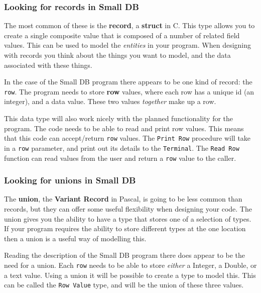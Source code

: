 \subsubsection{Looking for records in Small DB} %
\label{ssub:looking_for_records_in_small_db}

The most common of these is the \textbf{record}, a \textbf{struct} in C. This type allows you to create a single composite value that is composed of a number of related field values. This can be used to model the \emph{entities} in your program. When designing with records you think about the things you want to model, and the data associated with these things.

In the case of the Small DB program there appears to be one kind of record: the \texttt{row}. The program needs to store \textbf{row} values, where each row has a unique id (an integer), and a data value. These two values \emph{together} make up a row.

This data type will also work nicely with the planned functionality for the program. The code needs to be able to read and print row values. This means that this code can accept/return \texttt{row} values. The \texttt{Print Row} procedure will take in a \texttt{row} parameter, and print out its details to the \texttt{Terminal}. The \texttt{Read Row} function can read values from the user and return a \texttt{row} value to the caller.


\subsubsection{Looking for unions in Small DB} %
\label{ssub:looking_for_unions_in_small_db}

The \textbf{union}, the \textbf{Variant Record} in Pascal, is going to be less common than records, but they can offer some useful flexibility when designing your code. The union gives you the ability to have a type that stores one of a selection of types. If your program requires the ability to store different types at the one location then a union is a useful way of modelling this.

Reading the description of the Small DB program there does appear to be the need for a union. Each \texttt{row} needs to be able to store \emph{either} a Integer, a Double, or a text value. Using a union it will be possible to create a type to model this. This can be called the \texttt{Row Value} type, and will be the union of these three values.

